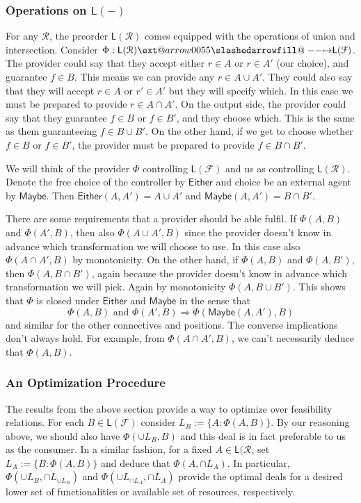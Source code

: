 \documentclass[12pt]{article}
\makeatletter
\theoremstyle{definition}
\theoremstyle{plain}
\theoremstyle{plain}
\theoremstyle{plain}
\theoremstyle{plain}
\theoremstyle{remark}
\theoremstyle{remark}
\newcommand{\mc}[1]{\mathcal{#1}}
\newcommand{\maybe}{\mathsf{Maybe}}
\newcommand{\either}{\mathsf{Either}}
\newcommand{\low}{\mathsf{L}}
\def\slashedarrowfill@#1#2#3#4#5{%
	$\m@th\thickmuskip0mu\medmuskip\thickmuskip\thinmuskip\thickmuskip
	\relax#5#1\mkern-7mu%
	\cleaders\hbox{$#5\mkern-2mu#2\mkern-2mu$}\hfill
	\mathclap{#3}\mathclap{#2}%
	\cleaders\hbox{$#5\mkern-2mu#2\mkern-2mu$}\hfill
	\mkern-7mu#4$%
}
\def\rightslashedarrowfill@{%
	\slashedarrowfill@\relbar\relbar\mapstochar\rightarrow}
\newcommand\xslashedrightarrow[2][]{%
	\ext@arrow 0055{\rightslashedarrowfill@}{#1}{#2}}
\makeatother
\begin{document}
\subsubsection{Operations on $\low(-)$}
For any $\mc{R}$, the preorder $\low(\mc{R})$ comes equipped with the operations of union and intersection. Consider $\Phi: \low(\mc{R}) \xslashedrightarrow{} \low(\mc{F})$. The provider could say that they accept either $r \in A$ or $r \in A'$ (our choice), and guarantee $f \in B$. This means we can provide any $r \in A \cup A'$. They could also say that they will accept $r \in A$ or $r' \in A'$ but they will specify which. In this case we must be prepared to provide $r \in A \cap A'$. On the output side, the provider could say that they guarantee $f \in B$ or $f \in B'$, and they choose which. This is the same as them guaranteeing $f \in B \cup B'$. On the other hand, if we get to choose whether $f \in B$ or $f \in B'$, the provider must be prepared to provide $f \in B \cap B'$.

We will think of the provider $\Phi$ controlling $\low(\mc{F})$ and us as controlling $\low(\mc{R})$. Denote the free choice of the controller by $\either$ and choice be an external agent by $\maybe$. Then $\either(A,A')= A \cup A'$ and $\maybe(A,A') = B \cap B'$. 

There are some requirements that a provider should be able fulfil. If $\Phi(A,B)$ and $\Phi(A',B)$, then also $\Phi(A \cup A', B)$ since the provider doesn't know in advance which transformation we will choose to use. In this case also $\Phi(A \cap A', B)$ by monotonicity. On the other hand, if $\Phi(A,B)$ and $\Phi(A,B')$, then $\Phi(A, B \cap B')$, again because the provider doesn't know in advance which transformation we will pick. Again by monotonicity $\Phi(A, B \cup B')$. This shows that $\Phi$ is closed under $\either$ and $\maybe$ in the sense that 
$$  \Phi(A,B) \text{ and } \Phi(A',B) \Rightarrow \Phi(\maybe(A,A'),B) $$
and similar for the other connectives and positions. The converse implications don't always hold. For example, from $\Phi(A \cap A', B)$, we can't necessarily deduce that $\Phi(A,B)$.

\subsubsection{An Optimization Procedure}
The results from the above section provide a way to optimize over feasibility relations. For each $B \in \low(\mc{F})$ consider $L_B := \{A : \Phi(A,B)\}$. By our reasoning above, we should also have $\Phi(\cup L_B, B)$ and this deal is in fact preferable to us as the consumer. In a similar fashion, for a fixed $A \in \low(\mc{R}$, set $L_A :=  \{B : \Phi(A,B)\}$ and deduce that $\Phi(A, \cap L_A)$. In particular, $\Phi(\cup L_B , \cap L_{\cup L_B})$ and $\Phi(\cup L_{\cap L_A} , \cap L_A)$ provide the optimal deals for a desired lower set of functionalities or available set of resources, respectively. 
\end{document}
